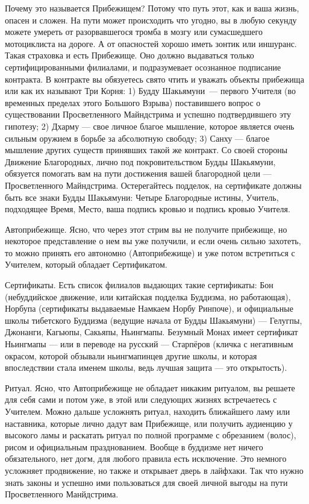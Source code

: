 Почему это называется Прибежищем? Потому что путь этот, как и
ваша жизнь, опасен и сложен. На пути может происходить что
угодно, вы в любую секунду можете умереть от разорвавшегося
тромба в мозгу или сумасшедшего мотоциклиста на дороге. А от
опасностей хорошо иметь зонтик или иншуранс. Такая страховка
и есть Прибежище. Оно должно выдаваться только сертифицированными
филиалами, и подразумевает осознанное подписание контракта.
В контракте вы обязуетесь свято чтить и уважать объекты
прибежища или как их называют Три Корня: 1) Будду Шакьямуни —
первого Учителя (во временных пределах этого Большого Взрыва)
поставившего вопрос о существовании Просветленного Майндстрима
и успешно подтвердившего эту гипотезу; 2) Дхарму — свое личное
благое мышление, которое является очень сильным оружием в
борьбе за абсолютную свободу; 3) Санху — благое мышление
других существ принявших такой же контракт. Со своей стороны
Движение Благородных, лично под покровительством Будды Шакьямуни,
обязуется помогать вам на пути достижения вашей благородной
цели — Просветленного Майндстрима. Остерегайтесь подделок,
на сертификате должны быть все знаки Будды Шакьямуни: Четыре
Благородные истины, Учитель, подходящее Время, Место, ваша
подпись кровью и подпись кровью Учителя. 

Автоприбежище. Ясно, что через этот стрим вы не получите
прибежище, но некоторое представление о нем вы уже получили,
и если очень сильно захотеть, то можно принять его автономно
(Автоприбежище) и уже потом встретиться с Учителем, который
обладает Сертификатом. 

Сертификаты. Есть список филиалов выдающих такие сертификаты:
Бон (небуддийское движение, или китайская подделка Буддизма,
но работающая), Норбупа (сертификаты выдаваемые Намкаем Норбу
Ринпоче), и официальные школы тибетского Буддизма (ведущие
начала от Будды Шакьямуни) — Гелугпы, Джонанги, Кагьюпы,
Сакьяпы, Ньингмапы. Безумный Монах имеет сертификат Ньингмапы
— или в переводе на русский — Старпёров (кличка с негативным
окрасом, которой обзывали ньингмапинцев другие школы, и которая
впоследствии стала именем школы, ведь лучшая защита — это открытость).

Ритуал. Ясно, что Автоприбежище не обладает никаким ритуалом,
вы решаете для себя сами и потом уже, в этой или следующих
жизнях встречаетесь с Учителем. Можно дальше усложнять ритуал,
находить ближайшего ламу или наставника, которые лично дадут
вам Прибежище, или получить аудиенцию у высокого ламы и
раскатать ритуал по полной программе с обрезанием (волос),
рисом и официальным празднованием. Вообще в буддизме нет
ничего обязательного, нет догм, для любого правила есть
исключение. Это немного усложняет продвижение, но также
и открывает дверь в лайфхаки. Так что нужно знать законы
и успешно ими пользоваться для своей личной выгоды на пути
Просветленного Манйдстрима.

